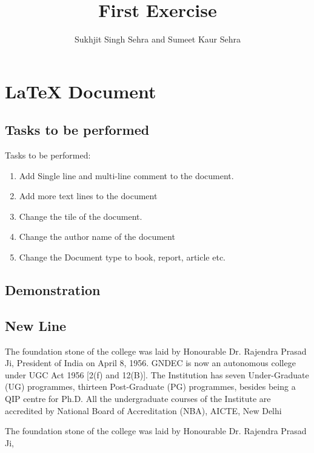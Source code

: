 \documentclass[12pt, letterpaper, twoside]{book}
\title{First Exercise}
\author{Sukhjit Singh Sehra and Sumeet Kaur Sehra}
\begin{document}
\maketitle

\chapter{LaTeX Document}
\section*{Tasks to be performed}
Tasks to be performed:
\begin{enumerate}
	\item Add Single line and multi-line comment to the document.
    \item Add more text lines to the document
    \item Change the tile of the document.
   \item Change the author name of the document
   \item Change the Document type to book, report, article etc.
\end{enumerate}
\section*{Demonstration}

\section{New Line}
The foundation stone of the college was laid by Honourable Dr. Rajendra Prasad Ji, President of India on April 8, 1956. GNDEC is now an autonomous college under UGC Act 1956 [2(f) and 12(B)]. The Institution has seven Under-Graduate (UG) programmes, thirteen Post-Graduate (PG) programmes, besides being a QIP centre for Ph.D. All the undergraduate courses of the Institute are accredited by  National Board of Accreditation (NBA), AICTE, New Delhi

The foundation stone of the college was laid by Honourable Dr. Rajendra Prasad Ji,
\end{document}
